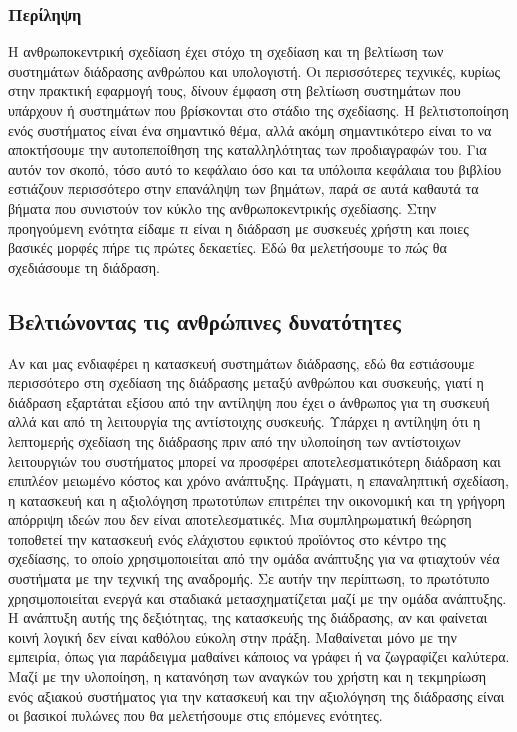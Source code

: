 \documentclass[
]{article}
\begin{document}
\hypertarget{ux3c0ux3b5ux3c1ux3afux3bbux3b7ux3c8ux3b7}{%
\subsubsection{Περίληψη}\label{ux3c0ux3b5ux3c1ux3afux3bbux3b7ux3c8ux3b7}}

Η ανθρωποκεντρική σχεδίαση έχει στόχο τη σχεδίαση και τη βελτίωση των
συστημάτων διάδρασης ανθρώπου και υπολογιστή. Οι περισσότερες τεχνικές,
κυρίως στην πρακτική εφαρμογή τους, δίνουν έμφαση στη βελτίωση
συστημάτων που υπάρχουν ή συστημάτων που βρίσκονται στο στάδιο της
σχεδίασης. Η βελτιστοποίηση ενός συστήματος είναι ένα σημαντικό θέμα,
αλλά ακόμη σημαντικότερο είναι το να αποκτήσουμε την αυτοπεποίθηση της
καταλληλότητας των προδιαγραφών του. Για αυτόν τον σκοπό, τόσο αυτό το
κεφάλαιο όσο και τα υπόλοιπα κεφάλαια του βιβλίου εστιάζουν περισσότερο
στην επανάληψη των βημάτων, παρά σε αυτά καθαυτά τα βήματα που συνιστούν
τον κύκλο της ανθρωποκεντρικής σχεδίασης. Στην προηγούμενη ενότητα
είδαμε \emph{τι} είναι η διάδραση με συσκευές χρήστη και ποιες βασικές
μορφές πήρε τις πρώτες δεκαετίες. Εδώ θα μελετήσουμε το \emph{πώς} θα
σχεδιάσουμε τη διάδραση.

\hypertarget{ux3b2ux3b5ux3bbux3c4ux3b9ux3ceux3bdux3bfux3bdux3c4ux3b1ux3c2-ux3c4ux3b9ux3c2-ux3b1ux3bdux3b8ux3c1ux3ceux3c0ux3b9ux3bdux3b5ux3c2-ux3b4ux3c5ux3bdux3b1ux3c4ux3ccux3c4ux3b7ux3c4ux3b5ux3c2}{%
\subsection{Βελτιώνοντας τις ανθρώπινες
δυνατότητες}\label{ux3b2ux3b5ux3bbux3c4ux3b9ux3ceux3bdux3bfux3bdux3c4ux3b1ux3c2-ux3c4ux3b9ux3c2-ux3b1ux3bdux3b8ux3c1ux3ceux3c0ux3b9ux3bdux3b5ux3c2-ux3b4ux3c5ux3bdux3b1ux3c4ux3ccux3c4ux3b7ux3c4ux3b5ux3c2}}

Αν και μας ενδιαφέρει η κατασκευή συστημάτων διάδρασης, εδώ θα
εστιάσουμε περισσότερο στη σχεδίαση της διάδρασης μεταξύ ανθρώπου και
συσκευής, γιατί η διάδραση εξαρτάται εξίσου από την αντίληψη που έχει ο
άνθρωπος για τη συσκευή αλλά και από τη λειτουργία της αντίστοιχης
συσκευής. Υπάρχει η αντίληψη ότι η λεπτομερής σχεδίαση της διάδρασης
πριν από την υλοποίηση των αντίστοιχων λειτουργιών του συστήματος μπορεί
να προσφέρει αποτελεσματικότερη διάδραση και επιπλέον μειωμένο κόστος
και χρόνο ανάπτυξης. Πράγματι, η επαναληπτική σχεδίαση, η κατασκευή και
η αξιολόγηση πρωτοτύπων επιτρέπει την οικονομική και τη γρήγορη απόρριψη
ιδεών που δεν είναι αποτελεσματικές. Μια συμπληρωματική θεώρηση
τοποθετεί την κατασκευή ενός ελάχιστου εφικτού προϊόντος στο κέντρο της
σχεδίασης, το οποίο χρησιμοποιείται από την ομάδα ανάπτυξης για να
φτιαχτούν νέα συστήματα με την τεχνική της αναδρομής. Σε αυτήν την
περίπτωση, το πρωτότυπο χρησιμοποιείται ενεργά και σταδιακά
μετασχηματίζεται μαζί με την ομάδα ανάπτυξης. Η ανάπτυξη αυτής της
δεξιότητας, της κατασκευής της διάδρασης, αν και φαίνεται κοινή λογική
δεν είναι καθόλου εύκολη στην πράξη. Μαθαίνεται μόνο με την εμπειρία,
όπως για παράδειγμα μαθαίνει κάποιος να γράφει ή να ζωγραφίζει καλύτερα.
Μαζί με την υλοποίηση, η κατανόηση των αναγκών του χρήστη και η
τεκμηρίωση ενός αξιακού συστήματος για την κατασκευή και την αξιολόγηση
της διάδρασης είναι οι βασικοί πυλώνες που θα μελετήσουμε στις επόμενες
ενότητες.
\end{document}
